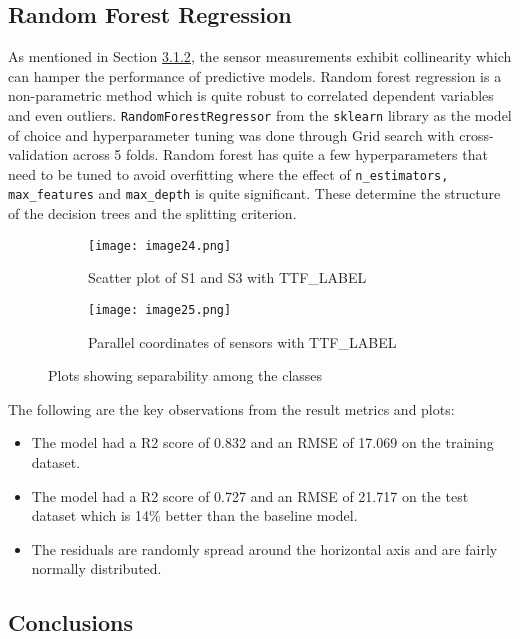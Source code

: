 \documentclass{article}
\begin{document}
\subsection{Random Forest Regression}
As mentioned in Section \hyperref[sec:corr]{3.1.2}, the sensor measurements exhibit collinearity which can hamper the performance of predictive models.
Random forest regression is a non-parametric method which is quite robust to correlated dependent variables and even outliers.
\texttt{RandomForestRegressor} from the \texttt{sklearn} library as the model of choice and hyperparameter tuning was done through Grid search with cross-validation across 5 folds.
Random forest has quite a few hyperparameters that need to be tuned to avoid overfitting where the effect of \texttt{n\_estimators, max\_features} and \texttt{max\_depth} is quite significant.
These determine the structure of the decision trees and the splitting criterion.
\begin{figure}[h]
	\begin{subfigure}{.5\textwidth}
		\centering
		\texttt{[image: image24.png]}
		\caption{Scatter plot of S1 and S3 with TTF\_LABEL}
		\label{fig:sfig1}
	\end{subfigure}%
	\begin{subfigure}{.5\textwidth}
		\centering
		\texttt{[image: image25.png]}
		\caption{Parallel coordinates of sensors with TTF\_LABEL}
		\label{fig:sfig2}
	\end{subfigure}
	\caption{Plots showing separability among the classes}
	\label{fig:fig}
\end{figure}
The following are the key observations from the result metrics and plots:
\begin{itemize}[topsep=0pt]
	\item The model had a R2 score of 0.832 and an RMSE of 17.069 on the training dataset.
	\item The model had a R2 score of 0.727 and an RMSE of 21.717 on the test dataset which is 14\% better than the baseline model.
	\item The residuals are randomly spread around the horizontal axis and are fairly normally distributed.
\end{itemize}
\subsection{Conclusions}
\newpage

\end{document}
